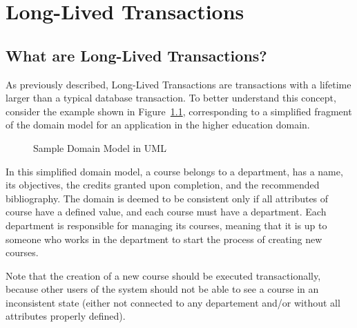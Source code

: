 \chapter{Long-Lived Transactions}

\section{What are Long-Lived Transactions?}
\label{sec:what}

As previously described, Long-Lived Transactions are transactions with
a lifetime larger than a typical database transaction. To better
understand this concept, consider the example shown in
Figure~\ref{fig:courseDomain}, corresponding to a simplified fragment
of the domain model for an application in the higher education domain.

\begin{figure}
  \centering

\caption{Sample Domain Model in UML}
\label{fig:courseDomain}

\end{figure}

In this simplified domain model, a course belongs to a department, has
a name, its objectives, the credits granted upon completion, and the
recommended bibliography. The domain is deemed to be consistent only
if all attributes of course have a defined value, and each course must
have a department. Each department is responsible for managing its
courses, meaning that it is up to someone who works in the department
to start the process of creating new courses.

Note that the creation of a new course should be executed
transactionally, because other users of the system should not be able
to see a course in an inconsistent state (either not connected to any
departement and/or without all attributes properly defined).

